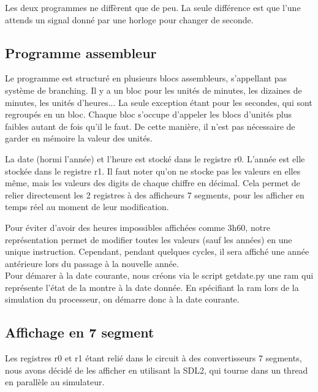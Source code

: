 \documentclass[a4paper]{article}
\begin{document}
Les deux programmes ne diffèrent que de peu. La seule différence est que l'une
attends un signal donné par une horloge pour changer de seconde.

\subsection{Programme assembleur}


Le programme est structuré en plusieurs blocs assembleurs, s'appellant pas
système de branching. Il y a un bloc pour les unités de minutes, les dizaines de
minutes, les unités d'heures... La seule exception étant pour les secondes, qui
sont regroupés en un bloc. Chaque bloc s'occupe d'appeler les blocs d'unités
plus faibles autant de fois qu'il le faut. De cette manière, il n'est pas
nécessaire de garder en mémoire la valeur des unités.

La date (hormi l'année) et l'heure est stocké dans le registre r0. L'année est
elle stockée dans le registre r1. Il faut noter qu'on ne stocke pas les valeurs
en elles même, mais les valeurs des digits de chaque chiffre en décimal. Cela
permet de relier directement les 2 registres à des afficheurs 7 segments, pour
les afficher en temps réel au moment de leur modification.

Pour éviter d'avoir des heures impossibles affichées comme 3h60, notre
représentation permet de modifier toutes les valeurs (sauf les années) en une
unique instruction. Cependant, pendant quelques cycles, il sera affiché une
année antérieure lors du passage à la nouvelle année.\\


Pour démarer à la date courante, nous créons via le script getdate.py une ram
qui représente l'état de la montre à la date donnée. En spécifiant la ram lors
de la simulation du processeur, on démarre donc à la date courante.


\subsection{Affichage en 7 segment}

Les registres r0 et r1 étant relié dans le circuit à des convertisseurs 7
segments, nous avons décidé de les afficher en utilisant la SDL2, qui tourne
dans un thread en parallèle au simulateur.
\end{document}

